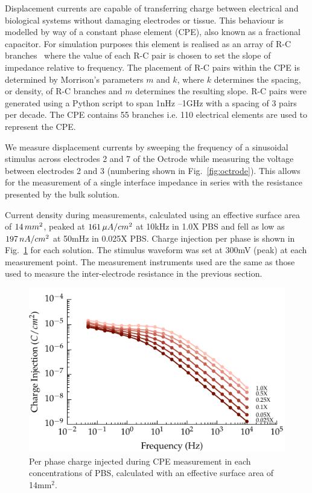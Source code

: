\documentclass[journal, a4paper]{IEEEtran}
\begin{document}
Displacement currents are capable of transferring charge between electrical and biological systems without damaging electrodes or tissue.\cite{Horch2004}
This behaviour is modelled by way of a constant phase element (CPE), also known as a fractional capacitor.
For simulation purposes this element is realised as an array of R-C branches~\cite{ScottSingle2013,Morrison59,Elwakil10} where the value of each R-C pair is chosen to set the slope of impedance relative to frequency. The placement of R-C pairs within the CPE is determined by Morrison's parameters $m$ and $k$, where $k$ determines the spacing, or density, of R-C branches and $m$ determines the resulting slope. R-C pairs were generated using a Python script to span 1\thinspace nHz --1\thinspace GHz with a spacing of 3 pairs per decade. The CPE contains 55 branches i.e. 110 electrical elements are used to represent the CPE.


We measure displacement currents by sweeping the frequency of a sinusoidal stimulus across electrodes 2 and 7 of the Octrode while measuring the voltage between electrodes 2 and 3 (numbering shown in Fig.~\ref{fig:octrode}).
This allows for the measurement of a single interface impedance in series with the resistance presented by the bulk solution.


Current density during measurements, calculated using an effective surface area of $14\thinspace mm^{2}$, peaked at $161\thinspace \mu A/cm^{2}$ at 10\thinspace kHz in 1.0X PBS and fell as low as $197\thinspace nA/cm^{2}$ at 50\thinspace mHz in 0.025X PBS.
Charge injection per phase is shown in Fig.~\ref{fig:chargeInjectionVsFrequency} for each solution.
The stimulus waveform was set at 300\thinspace mV (peak) at each measurement point. The measurement instruments used are the same as those used to measure the inter-electrode resistance in the previous section.

\begin{figure}
    \begin{center}
        \includegraphics{graphics/chargeInjectionEffectiveVsFrequency_magnitude}
    \end{center}
    \caption{Per phase charge injected during CPE measurement in each concentrations of PBS, calculated with an effective surface area of 14\thinspace mm$^{2}$.}
    \label{fig:chargeInjectionVsFrequency}
\end{figure}
\end{document}
